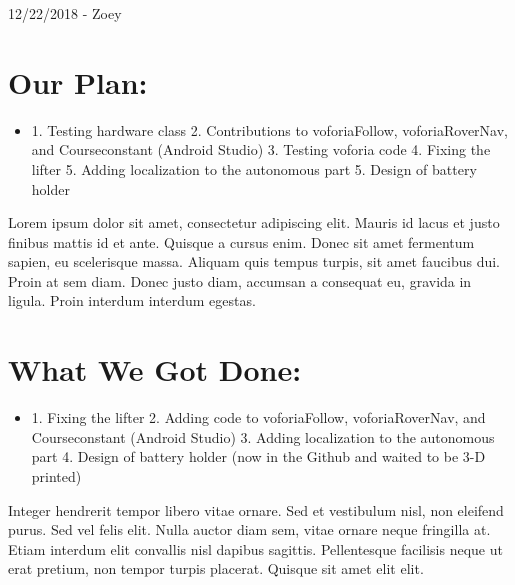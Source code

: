 \documentclass[12pt]{article}
\begin{document}
12/22/2018 - Zoey

\section{Our Plan:} %
\begin{itemize} We mostly focus on the coding part as well as new design today
	\item 1. Testing hardware class 
	        2. Contributions to voforiaFollow, voforiaRoverNav, and Courseconstant (Android Studio)
	        3. Testing voforia code
	        4. Fixing the lifter
	        5. Adding localization to the autonomous part
	        5. Design of battery holder 
\end{itemize}

Lorem ipsum dolor sit amet, consectetur adipiscing elit. Mauris id lacus et justo finibus mattis id et ante. Quisque a cursus enim. Donec sit amet fermentum sapien, eu scelerisque massa. Aliquam quis tempus turpis, sit amet faucibus dui. Proin at sem diam. Donec justo diam, accumsan a consequat eu, gravida in ligula. Proin interdum interdum egestas.

\section{What We Got Done:} %
\begin{itemize}

	\item 1. Fixing the lifter
	          2. Adding code to voforiaFollow, voforiaRoverNav, and Courseconstant (Android Studio)
	          3. Adding localization to the autonomous part
	          4. Design of battery holder (now in the Github and waited to be 3-D printed)
\end{itemize}

Integer hendrerit tempor libero vitae ornare. Sed et vestibulum nisl, non eleifend purus. Sed vel felis elit. Nulla auctor diam sem, vitae ornare neque fringilla at. Etiam interdum elit convallis nisl dapibus sagittis. Pellentesque facilisis neque ut erat pretium, non tempor turpis placerat. Quisque sit amet elit elit.
\end{document}
